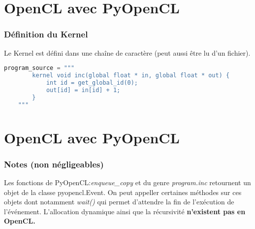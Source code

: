\documentclass[8pt]{beamer}
\begin{document}
\section{OpenCL avec PyOpenCL}
\begin{frame}[fragile]
    \frametitle{Définition du Kernel}
    Le Kernel est défini dans une chaîne de caractère 
    (peut aussi être lu d'un fichier).
    \begin{lstlisting}[language=python]
    program_source = """
        kernel void inc(global float * in, global float * out) {
            int id = get_global_id(0);
            out[id] = in[id] + 1;
        }
    """
    \end{lstlisting}
\end{frame}

\section{OpenCL avec PyOpenCL}
\begin{frame}
    \frametitle{Notes (non négligeables)}
    Les fonctions de PyOpenCL:\@ \textit{enqueue\_copy} et du genre \textit{program.inc}
    retournent un objet de la classe pyopencl.Event. On peut appeller certaines méthodes
    sur ces objets dont notamment \textit{wait()} qui permet d'attendre la fin de 
    l'exécution de l'événement.
    \vspace{20pt}
    \newline
    L'allocation dynamique ainsi que la récursivité \textbf{n'existent pas en OpenCL.}
\end{frame}
\end{document}
